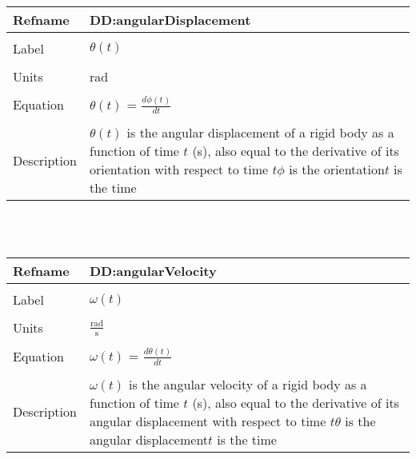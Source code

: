 \documentclass[12pt]{article}
\begin{document}
~\newline
\noindent \begin{minipage}{\textwidth}
\begin{tabular}{p{} p{}}
\toprule \textbf{Refname} & \textbf{DD:angularDisplacement}
\label{DD:angularDisplacement}
\\ \midrule \\
Label & $\theta{}(t)$
\\ \midrule \\
Units & rad
\\ \midrule \\
Equation & $\theta{}(t)$ = $\frac{d\phi{}(t)}{dt}$
\\ \midrule \\
Description & $\theta{}(t)$ is the angular displacement of a rigid body as a function of time $t$ (s), also equal to the derivative of its orientation with respect to time $t$\newline$\phi{}$ is the orientation\newline$t$ is the time
\\ \bottomrule \end{tabular}
\end{minipage}\\
~\newline
\noindent \begin{minipage}{\textwidth}
\begin{tabular}{p{} p{}}
\toprule \textbf{Refname} & \textbf{DD:angularVelocity}
\label{DD:angularVelocity}
\\ \midrule \\
Label & $\omega{}(t)$
\\ \midrule \\
Units & $\frac{\text{rad}}{\text{s}}$
\\ \midrule \\
Equation & $\omega{}(t)$ = $\frac{d\theta{}(t)}{dt}$
\\ \midrule \\
Description & $\omega{}(t)$ is the angular velocity of a rigid body as a function of time $t$ (s), also equal to the derivative of its angular displacement with respect to time $t$\newline$\theta{}$ is the angular displacement\newline$t$ is the time
\\ \bottomrule \end{tabular}
\end{minipage}\\
\end{document}
